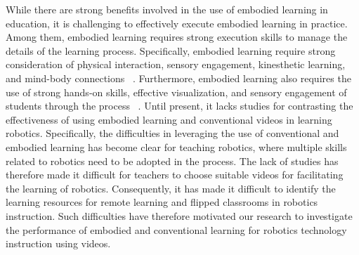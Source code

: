 \noindent While there are strong benefits involved in the use of embodied learning in education, it is challenging to effectively execute embodied learning in practice. Among them, embodied learning requires strong execution skills to manage the details of the learning process. Specifically, embodied learning require strong consideration of physical interaction, sensory engagement, kinesthetic learning, and mind-body connections ~\cite{anderson2003embodied,barsalou2008grounded,skulmowski2018embodied}. Furthermore, embodied learning also requires the use of strong hands-on skills, effective visualization, and sensory engagement of students through the process ~\cite{dede2014role,poria2017review}.  Until present, it lacks studies for contrasting the effectiveness of using embodied learning and conventional videos in learning robotics. Specifically, the difficulties in leveraging the use of conventional and embodied learning has become clear for teaching robotics, where multiple skills related to robotics need to be adopted in the process. The lack of studies has therefore made it difficult for teachers to choose suitable videos for facilitating the learning of robotics. Consequently, it has made it difficult to identify the learning resources for remote learning and flipped classrooms in robotics instruction. Such difficulties have therefore motivated our research to investigate the performance of embodied and conventional learning for robotics technology instruction using videos.  




 


